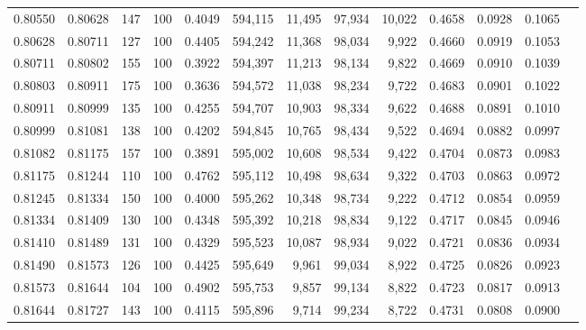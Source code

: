 \begin{tabular}{rrrrrrrrrrrrr}
0.80550 & 0.80628 &   147 & 100 &                                     0.4049 & 594,115 &  11,495 &  97,934 &  10,022 & 0.4658 & 0.0928 & 0.1065 \\
0.80628 & 0.80711 &   127 & 100 &                                     0.4405 & 594,242 &  11,368 &  98,034 &   9,922 & 0.4660 & 0.0919 & 0.1053 \\
0.80711 & 0.80802 &   155 & 100 &                                     0.3922 & 594,397 &  11,213 &  98,134 &   9,822 & 0.4669 & 0.0910 & 0.1039 \\
0.80803 & 0.80911 &   175 & 100 &                                     0.3636 & 594,572 &  11,038 &  98,234 &   9,722 & 0.4683 & 0.0901 & 0.1022 \\
0.80911 & 0.80999 &   135 & 100 &                                     0.4255 & 594,707 &  10,903 &  98,334 &   9,622 & 0.4688 & 0.0891 & 0.1010 \\
0.80999 & 0.81081 &   138 & 100 &                                     0.4202 & 594,845 &  10,765 &  98,434 &   9,522 & 0.4694 & 0.0882 & 0.0997 \\
0.81082 & 0.81175 &   157 & 100 &                                     0.3891 & 595,002 &  10,608 &  98,534 &   9,422 & 0.4704 & 0.0873 & 0.0983 \\
0.81175 & 0.81244 &   110 & 100 &                                     0.4762 & 595,112 &  10,498 &  98,634 &   9,322 & 0.4703 & 0.0863 & 0.0972 \\
0.81245 & 0.81334 &   150 & 100 &                                     0.4000 & 595,262 &  10,348 &  98,734 &   9,222 & 0.4712 & 0.0854 & 0.0959 \\
0.81334 & 0.81409 &   130 & 100 &                                     0.4348 & 595,392 &  10,218 &  98,834 &   9,122 & 0.4717 & 0.0845 & 0.0946 \\
0.81410 & 0.81489 &   131 & 100 &                                     0.4329 & 595,523 &  10,087 &  98,934 &   9,022 & 0.4721 & 0.0836 & 0.0934 \\
0.81490 & 0.81573 &   126 & 100 &                                     0.4425 & 595,649 &   9,961 &  99,034 &   8,922 & 0.4725 & 0.0826 & 0.0923 \\
0.81573 & 0.81644 &   104 & 100 &                                     0.4902 & 595,753 &   9,857 &  99,134 &   8,822 & 0.4723 & 0.0817 & 0.0913 \\
0.81644 & 0.81727 &   143 & 100 &                                     0.4115 & 595,896 &   9,714 &  99,234 &   8,722 & 0.4731 & 0.0808 & 0.0900 \\

\end{tabular}
